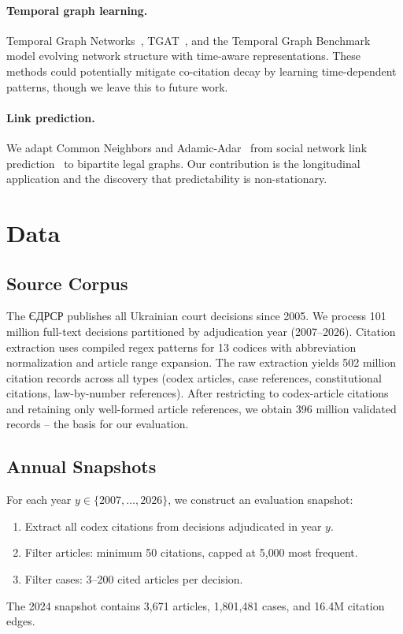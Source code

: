\documentclass[11pt]{article}
\begin{document}
\paragraph{Temporal graph learning.}
Temporal Graph Networks~\citep{rossi2020temporal}, TGAT~\citep{xu2020inductive}, and the Temporal Graph Benchmark~\citep{huang2023temporal} model evolving network structure with time-aware representations.
These methods could potentially mitigate co-citation decay by learning time-dependent patterns, though we leave this to future work.

\paragraph{Link prediction.}
We adapt Common Neighbors and Adamic-Adar~\citep{adamic2003friends} from social network link prediction~\citep{liben2007link} to bipartite legal graphs.
Our contribution is the longitudinal application and the discovery that predictability is non-stationary.

\section{Data}
\label{sec:data}

\subsection{Source Corpus}

The ЄДРСР publishes all Ukrainian court decisions since 2005.
We process 101 million full-text decisions partitioned by adjudication year (2007--2026).
Citation extraction uses compiled regex patterns for 13 codices with abbreviation normalization and article range expansion.
The raw extraction yields 502 million citation records across all types (codex articles, case references, constitutional citations, law-by-number references).
After restricting to codex-article citations and retaining only well-formed article references, we obtain 396 million validated records -- the basis for our evaluation.

\subsection{Annual Snapshots}

For each year $y \in \{2007, \ldots, 2026\}$, we construct an evaluation snapshot:
\begin{enumerate}[nosep,leftmargin=*]
  \item Extract all codex citations from decisions adjudicated in year $y$.
  \item Filter articles: minimum 50 citations, capped at 5{,}000 most frequent.
  \item Filter cases: 3--200 cited articles per decision.
\end{enumerate}
The 2024 snapshot contains 3{,}671 articles, 1{,}801{,}481 cases, and 16.4M citation edges.
\end{document}
